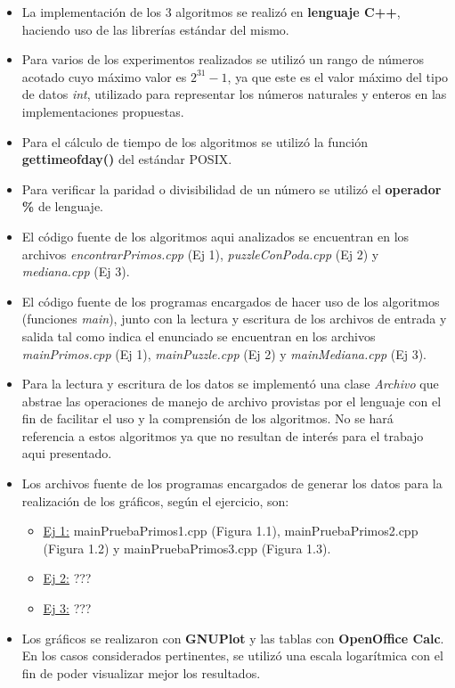 \documentclass[a4paper,10pt] {article}
\begin{document}
\begin{itemize}
 \item La implementaci\'on de los 3 algoritmos se realiz\'o en \textbf{lenguaje C++}, haciendo uso de las librer\'ias est\'andar del mismo.
 \item Para varios de los experimentos realizados se utiliz\'o un rango de n\'umeros acotado cuyo m\'aximo valor es $2^{31}-1$, ya que este es el valor m\'aximo del tipo de datos \textit{int}, utilizado para representar los n\'umeros naturales y enteros en las implementaciones propuestas.
 \item Para el c\'alculo de tiempo de los algoritmos se utiliz\'o la funci\'on \textbf{gettimeofday()} del est\'andar POSIX.
 \item Para verificar la paridad o divisibilidad de un n\'umero se utiliz\'o el \textbf{operador \%} de lenguaje.
 \item El c\'odigo fuente de los algoritmos aqui analizados se encuentran en los archivos \textit{encontrarPrimos.cpp} (Ej 1), \textit{puzzleConPoda.cpp} (Ej 2) y \textit{mediana.cpp} (Ej 3).
 \item El c\'odigo fuente de los programas encargados de hacer uso de los algoritmos (funciones \textit{main}), junto con la lectura y escritura de los archivos de entrada y salida tal como indica el enunciado se encuentran en los archivos \textit{mainPrimos.cpp} (Ej 1), \textit{mainPuzzle.cpp} (Ej 2) y \textit{mainMediana.cpp} (Ej 3). 
 \item Para la lectura y escritura de los datos se implement\'o una clase \textit{Archivo} que abstrae las operaciones de manejo de archivo provistas por el lenguaje con el fin de facilitar el uso y la comprensi\'on de los algoritmos. No se har\'a referencia a estos algoritmos ya que no resultan de inter\'es para el trabajo aqui presentado.
 \item Los archivos fuente de los programas encargados de generar los datos para la realizaci\'on de los gr\'aficos, seg\'un el ejercicio, son:
  \begin{itemize}
    \item \underline{Ej 1:} mainPruebaPrimos1.cpp (Figura 1.1), mainPruebaPrimos2.cpp (Figura 1.2) y mainPruebaPrimos3.cpp (Figura 1.3).
    \item \underline{Ej 2:} ???
    \item \underline{Ej 3:} ???
  \end{itemize}
 \item Los gr\'aficos se realizaron con \textbf{GNUPlot} y las tablas con \textbf{OpenOffice Calc}. En los casos considerados pertinentes, se utiliz\'o una escala logar\'itmica con el fin de poder visualizar mejor los resultados.
\end{itemize}
\end{document}
